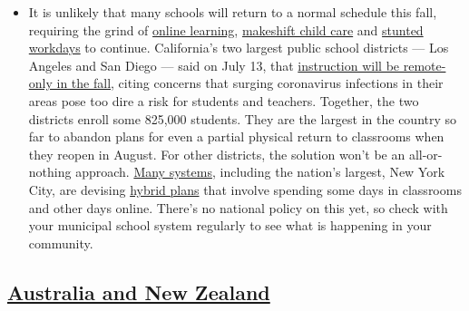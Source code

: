 \begin{itemize}
  \begin{itemize}
  \tightlist
  \item
    It is unlikely that many schools will return to a normal schedule
    this fall, requiring the grind of
    \href{https://www.nytimes.com/2020/06/05/us/coronavirus-education-lost-learning.html?action=click\&pgtype=Article\&state=default\&region=MAIN_CONTENT_3\&context=storylines_faq}{online
    learning},
    \href{https://www.nytimes.com/2020/05/29/us/coronavirus-child-care-centers.html?action=click\&pgtype=Article\&state=default\&region=MAIN_CONTENT_3\&context=storylines_faq}{makeshift
    child care} and
    \href{https://www.nytimes.com/2020/06/03/business/economy/coronavirus-working-women.html?action=click\&pgtype=Article\&state=default\&region=MAIN_CONTENT_3\&context=storylines_faq}{stunted
    workdays} to continue. California's two largest public school
    districts --- Los Angeles and San Diego --- said on July 13, that
    \href{https://www.nytimes.com/2020/07/13/us/lausd-san-diego-school-reopening.html?action=click\&pgtype=Article\&state=default\&region=MAIN_CONTENT_3\&context=storylines_faq}{instruction
    will be remote-only in the fall}, citing concerns that surging
    coronavirus infections in their areas pose too dire a risk for
    students and teachers. Together, the two districts enroll some
    825,000 students. They are the largest in the country so far to
    abandon plans for even a partial physical return to classrooms when
    they reopen in August. For other districts, the solution won't be an
    all-or-nothing approach.
    \href{https://bioethics.jhu.edu/research-and-outreach/projects/eschool-initiative/school-policy-tracker/}{Many
    systems}, including the nation's largest, New York City, are
    devising
    \href{https://www.nytimes.com/2020/06/26/us/coronavirus-schools-reopen-fall.html?action=click\&pgtype=Article\&state=default\&region=MAIN_CONTENT_3\&context=storylines_faq}{hybrid
    plans} that involve spending some days in classrooms and other days
    online. There's no national policy on this yet, so check with your
    municipal school system regularly to see what is happening in your
    community.
  \end{itemize}
\end{itemize}

\hypertarget{australia-and-new-zealand}{%
\subsection{\texorpdfstring{\href{https://www.nytimes.com/section/world/australia}{Australia
and New
Zealand}}{Australia and New Zealand}}\label{australia-and-new-zealand}}

